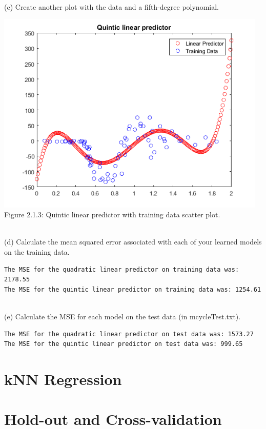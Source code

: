 \documentclass[]{report}   %
\begin{document}
~\\ 
(c) Create another plot with the data and a fifth-degree polynomial.
\begin{center}
	\includegraphics[width=35em]{2_1_Figure_3.png}
	{Figure 2.1.3: Quintic linear predictor with training data scatter plot.}
\end{center}
~\\
(d) Calculate the mean squared error associated with each of your learned models on the training
data.
\begin{lstlisting}[caption=Matlab output for MSE calculations on training data.]
The MSE for the quadratic linear predictor on training data was: 2178.55
The MSE for the quintic linear predictor on training data was: 1254.61
\end{lstlisting}
~\\
(e) Calculate the MSE for each model on the test data (in mcycleTest.txt).
\begin{lstlisting}[caption=Matlab output for MSE calculations on test data.]
The MSE for the quadratic linear predictor on test data was: 1573.27
The MSE for the quintic linear predictor on test data was: 999.65
\end{lstlisting}





\section{kNN Regression}
\section{Hold-out and Cross-validation}
\end{document}
